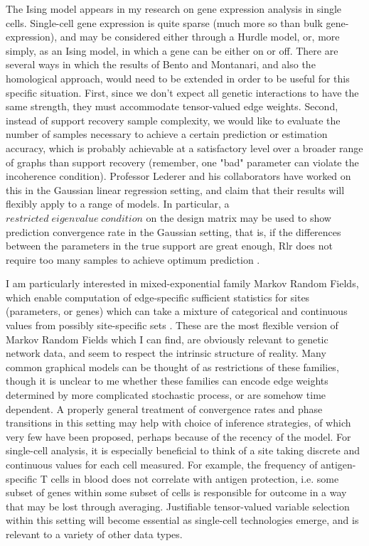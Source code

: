 \documentclass[12pt]{article}
\begin{document}
The Ising model appears in my research on gene expression analysis in single cells.  Single-cell gene expression is quite sparse (much more so than bulk gene-expression), and may be considered either through a Hurdle model, or, more simply, as an Ising model, in which a gene can be either on or off.  There are several ways in which the results of Bento and Montanari, and also the homological approach, would need to be extended in order to be useful for this specific situation.  First, since we don't expect all genetic interactions to have the same strength, they must accommodate tensor-valued edge weights.  Second, instead of support recovery sample complexity, we would like to evaluate the number of samples necessary to achieve a certain prediction or estimation accuracy, which is probably achievable at a satisfactory level over a broader range of graphs than support recovery (remember, one "bad" parameter can violate the incoherence condition).  Professor Lederer and his collaborators have worked on this in the Gaussian linear regression setting, and claim that their results will flexibly apply to a range of models.  In particular, a $restricted\;eigenvalue\;condition$ on the design matrix may be used to show prediction convergence rate in the Gaussian setting, that is, if the differences between the parameters in the true support are great enough, Rlr does not require too many samples to achieve optimum prediction \citep{Dalalyan2014-al}.

I am particularly interested in mixed-exponential family Markov Random Fields, which enable computation of edge-specific sufficient statistics for sites (parameters, or genes) which can take a mixture of categorical and continuous values from possibly site-specific sets \citep{Yang2014-tc}.  These are the most flexible version of Markov Random Fields which I can find, are obviously relevant to genetic network data, and seem to respect the intrinsic structure of reality.   Many common graphical models can be thought of as restrictions of these families, though it is unclear to me whether these families can encode edge weights determined by more complicated stochastic process, or are somehow time dependent.  A properly general treatment of convergence rates and phase transitions in this setting may help with choice of inference strategies, of which very few have been proposed, perhaps because of the recency of the model.  For single-cell analysis, it is especially beneficial to think of a site taking discrete and continuous values for each cell measured.  For example, the frequency of antigen-specific T cells in blood does not correlate with antigen protection, i.e. some subset of genes within some subset of cells is responsible for outcome in a way that may be lost through averaging.  Justifiable tensor-valued variable selection within this setting will become essential as single-cell technologies emerge, and is relevant to a variety of other data types.



\end{document}
